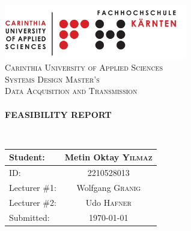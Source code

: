 \begin{titlepage}
    \begin{center}
        \includegraphics[width=0.60\textwidth]{pics/FH}\\[1.5cm]

        \textsc{\LARGE Carinthia University of Applied Sciences}\\[1.5cm]

        \textsc{\Large Systems Design Master's}\\[1.5cm]
        \textsc{\Large Data Acquisition and Transmission}\\[2.5cm]

        \HRule \\[1cm]

        { \LARGE \bfseries \textsc{FEASIBILITY REPORT}}

        \HRule \\[1cm]

        \vspace{2.5cm}

        	\begin{table}[H]
        		\centering
        		\begin{tabular}{|l|c|}
        			\toprule
        			Student: & Metin Oktay \textsc{Yilmaz} \\
        			\midrule
        			ID: & 2210528013   	\\
        			Lecturer \#1: & Wolfgang  \textsc{Granig}  \\
                    Lecturer \#2: & Udo  \textsc{Hafner}  \\
        			Submitted: & {\large \today}  	\\
        			\bottomrule
        		\end{tabular}
        	\end{table}
    \end{center}
\end{titlepage}